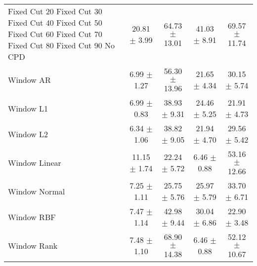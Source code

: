 \begin{table}[!htpb]
\begin{tabular}{lcccc}
Fixed Cut 20%
Fixed Cut 30%
Fixed Cut 40%
Fixed Cut 50%
Fixed Cut 60%
Fixed Cut 70%
Fixed Cut 80%
Fixed Cut 90%
No CPD & 20.81 $\pm$ 3.99 & 64.73 $\pm$ 13.01 & 41.03 $\pm$ 8.91 & 69.57 $\pm$ 11.74 \\
Window AR & 6.99 $\pm$ 1.27 & 56.30 $\pm$ 13.96 & 21.65 $\pm$ 4.34 & 30.15 $\pm$ 5.74 \\
Window L1 & 6.99 $\pm$ 0.83 & 38.93 $\pm$ 9.31 & 24.46 $\pm$ 5.25 & 21.91 $\pm$ 4.73 \\
Window L2 & 6.34 $\pm$ 1.06 & 38.82 $\pm$ 9.05 & 21.94 $\pm$ 4.70 & 29.56 $\pm$ 5.42 \\
Window Linear & 11.15 $\pm$ 1.74 & 22.24 $\pm$ 5.72 & 6.46 $\pm$ 0.88 & 53.16 $\pm$ 12.66 \\
Window Normal & 7.25 $\pm$ 1.11 & 25.75 $\pm$ 5.76 & 25.97 $\pm$ 5.79 & 33.70 $\pm$ 6.71 \\
Window RBF & 7.47 $\pm$ 1.14 & 42.98 $\pm$ 9.44 & 30.04 $\pm$ 6.86 & 22.90 $\pm$ 3.48 \\
Window Rank & 7.48 $\pm$ 1.10 & 68.90 $\pm$ 14.38 & 6.46 $\pm$ 0.88 & 52.12 $\pm$ 10.67 \\
        \bottomrule
    \end{tabular}
    \label{tab:etResults}
\end{table}
